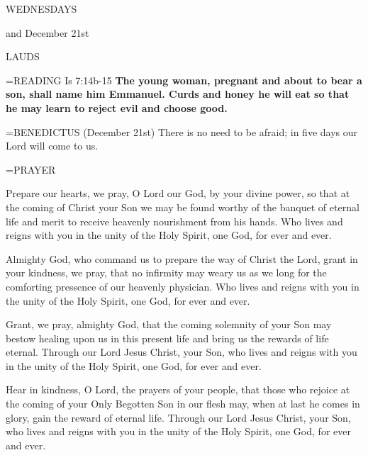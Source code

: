 \begin{center}
\normalsize \begin{center}\normalsize WEDNESDAYS\\
\end{center}
\footnotesize and December 21st\\
\end{center}

\begin{flushleft}\normalsize LAUDS\\\end{flushleft}

\hangindent=\parindent \small{READING} Is 7:14b-15 \textbf{The young woman, pregnant and about to bear a son, shall name him Emmanuel. Curds and honey he will eat so that he may learn to reject evil and choose good.\\}

\hangindent=\parindent \small{BENEDICTUS  (December 21st) There is no need to be afraid; in five days our Lord will come to us.\\}

\hangindent=\parindent \small PRAYER
\begin{description}[labelindent=\parindent, noitemsep, leftmargin=*]
\item [Week 1:]  Prepare our hearts, we pray, O Lord our God, by your divine power, so that at the coming of Christ your Son we may be found worthy of the banquet of eternal life and merit to receive heavenly nourishment from his hands. Who lives and reigns with you in the unity of the Holy Spirit, one God, for ever and ever.
\item [Week 2:]  Almighty God, who command us to prepare the way of Christ the Lord, grant in your kindness, we pray, that no infirmity may weary us as we long for the comforting pressence of our heavenly physician. Who lives and reigns with you in the unity of the Holy Spirit, one God, for ever and ever.
\item [Week 3:]  Grant, we pray, almighty God, that the coming solemnity of your Son may bestow healing upon us in this present life and bring us the rewards of life eternal. Through our Lord Jesus Christ, your Son, who lives and reigns with you in the unity of the Holy Spirit, one God, for ever and ever.
\item [December 21st:]  Hear in kindness, O Lord, the prayers of your people, that those who rejoice at the coming of your Only Begotten Son in our flesh may, when at last he comes in glory, gain the reward of eternal life. Through our Lord Jesus Christ, your Son, who lives and reigns with you in the unity of the Holy Spirit, one God, for ever and ever.
\end{description}

